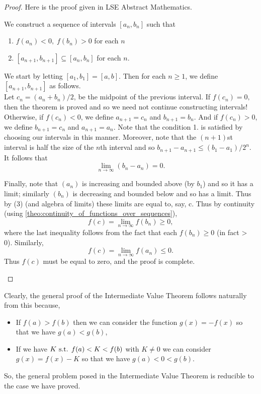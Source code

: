 \documentclass[MathsNotesBase.tex]{subfiles}
\begin{document}
{\begin{proof}
			Here is the proof given in LSE Abstract Mathematics.\\
			\begin{displayquote}
				We construct a sequence of intervals ${ [a_n, b_n] }$ such that
				\begin{enumerate}
					\item{${ f(a_n) < 0,\; f(b_n) > 0 }$ for each $ n $}
					\item{${ [a_{n+1}, b_{n+1}] \subseteq [a_n, b_n] }$ for each $ n $.}
				\end{enumerate}				
				We start by letting ${ [a_1, b_1] = [a, b]. }$ Then for each ${ n \geq 1 }$, we define ${ [a_{n+1}, b_{n+1}] }$ as follows.\\
				
				Let ${ c_n = (a_n + b_n)/2 }$, be the midpoint of the previous interval. If ${ f(c_n) = 0, }$ then the
				theorem is proved and so we need not continue constructing intervals!\\
				
				Otherwise, if ${ f(c_n) < 0 }$, we define ${ a_{n+1} = c_n }$ and ${ b_{n+1} = b_n }$. And if ${ f(c_n) > 0 }$, we define
				${ b_{n+1} = c_n }$ and ${ a_{n+1} = a_n }$. Note that the condition 1. is satisfied by choosing our intervals in this manner.
				Moreover, note that the ${ (n + 1) }$st interval is half the size of the $n$th interval and so
				${ b_{n+1} - a_{n+1} \leq (b_1 - a_1)/2^n }$. It follows that
				\[ \lim_{n \to \infty} (b_n - a_n) = 0.  \tag{3}\]
				
				Finally, note that $ (a_n) $ is increasing and bounded above (by $ b_1 $) and so it has a limit; similarly $ (b_n) $ is decreasing and bounded below and so has a limit. Thus by (3) (and algebra of limits) these limits are equal to, say, c. Thus by continuity (using \autoref{theo:continuity_of_functions_over_sequences}),
				\[ f(c) = \lim_{n \to \infty} f(b_n) \geq 0, \]
				where the last inequality follows from the fact that each ${ f(b_n) \geq 0 }$ (in fact > 0). Similarly,
				\[ f(c) = \lim_{n \to \infty} f(a_n) \leq 0. \]
				Thus $ f(c) $ must be equal to zero, and the proof is complete.
			\end{displayquote}
		\end{proof}
		Clearly, the general proof of the Intermediate Value Theorem follows naturally from this because,
		\begin{itemize}
			\item{If ${ f(a) > f(b) }$ then we can consider the function ${ g(x) = -f(x) }$ so that we have ${ g(a) < g(b) }$,}
			\item{If we have ${ K \text{ s.t. } f(a) < K < f(b) }$ with ${ K \neq 0 }$ we can consider ${ g(x) = f(x) - K }$ so that we have ${ g(a) < 0 < g(b) }$.}
		\end{itemize}
		So, the general problem posed in the Intermediate Value Theorem is reducible to the case we have proved.
		
}
\end{document}
